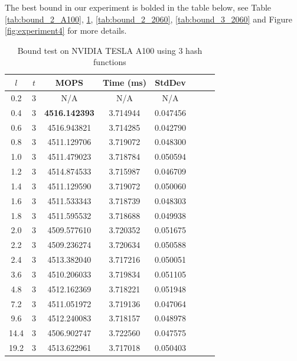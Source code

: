 \documentclass[10pt,twocolumn,letterpaper]{article}
\begin{document}
The best bound in our experiment is bolded in the table below, see Table \ref{tab:bound_2_A100}, \ref{tab:bound_3_A100}, \ref{tab:bound_2_2060}, \ref{tab:bound_3_2060} and Figure \ref{fig:experiment4} for more details.

\begin{table}[!h]
    \centering
   \begin{tabular}{@{}c|ccccccc@{}}
\toprule
$l$ & $t$ & MOPS    & Time (ms)& StdDev  \\ \midrule
0.2 & 3 & N/A & N/A & N/A \\
0.4 & 3 & \textbf{4516.142393} & 3.714944 & 0.047456 \\
0.6 & 3 & 4516.943821 & 3.714285 & 0.042790 \\
0.8 & 3 & 4511.129706 & 3.719072 & 0.048300 \\
1.0 & 3 & 4511.479023 & 3.718784 & 0.050594 \\
1.2 & 3 & 4514.874533 & 3.715987 & 0.046709 \\
1.4 & 3 & 4511.129590 & 3.719072 & 0.050060 \\
1.6 & 3 & 4511.533343 & 3.718739 & 0.048303 \\
1.8 & 3 & 4511.595532 & 3.718688 & 0.049938 \\
2.0 & 3 & 4509.577610 & 3.720352 & 0.051675 \\
2.2 & 3 & 4509.236274 & 3.720634 & 0.050588 \\
2.4 & 3 & 4513.382040 & 3.717216 & 0.050051 \\
3.6 & 3 & 4510.206033 & 3.719834 & 0.051105 \\
4.8 & 3 & 4512.162369 & 3.718221 & 0.051948 \\
7.2 & 3 & 4511.051972 & 3.719136 & 0.047064 \\
9.6 & 3 & 4512.240083 & 3.718157 & 0.048978 \\
14.4 & 3 & 4506.902747 & 3.722560 & 0.047575 \\
19.2 & 3 & 4513.622961 & 3.717018 & 0.050403 \\
\bottomrule
\end{tabular}
    \caption{Bound test on NVIDIA TESLA A100 using $3$ hash functions}
    \label{tab:bound_3_A100}
\end{table}
\end{document}
